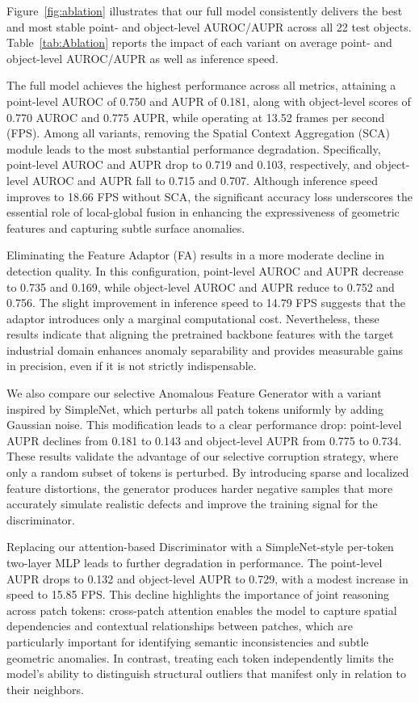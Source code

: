 Figure~\ref{fig:ablation} illustrates that our full model consistently delivers the best and most stable point- and object-level AUROC/AUPR across all 22 test objects. Table~\ref{tab:Ablation} reports the impact of each variant on average point- and object-level AUROC/AUPR as well as inference speed.

The full model achieves the highest performance across all metrics, attaining a point-level AUROC of 0.750 and AUPR of 0.181, along with object-level scores of 0.770 AUROC and 0.775 AUPR, while operating at 13.52 frames per second (FPS). Among all variants, removing the Spatial Context Aggregation (SCA) module leads to the most substantial performance degradation. Specifically, point-level AUROC and AUPR drop to 0.719 and 0.103, respectively, and object-level AUROC and AUPR fall to 0.715 and 0.707. Although inference speed improves to 18.66 FPS without SCA, the significant accuracy loss underscores the essential role of local-global fusion in enhancing the expressiveness of geometric features and capturing subtle surface anomalies.

Eliminating the Feature Adaptor (FA) results in a more moderate decline in detection quality. In this configuration, point-level AUROC and AUPR decrease to 0.735 and 0.169, while object-level AUROC and AUPR reduce to 0.752 and 0.756. The slight improvement in inference speed to 14.79 FPS suggests that the adaptor introduces only a marginal computational cost. Nevertheless, these results indicate that aligning the pretrained backbone features with the target industrial domain enhances anomaly separability and provides measurable gains in precision, even if it is not strictly indispensable.

We also compare our selective Anomalous Feature Generator with a variant inspired by SimpleNet, which perturbs all patch tokens uniformly by adding Gaussian noise. This modification leads to a clear performance drop: point-level AUPR declines from 0.181 to 0.143 and object-level AUPR from 0.775 to 0.734. These results validate the advantage of our selective corruption strategy, where only a random subset of tokens is perturbed. By introducing sparse and localized feature distortions, the generator produces harder negative samples that more accurately simulate realistic defects and improve the training signal for the discriminator.

Replacing our attention-based Discriminator with a SimpleNet-style per-token two-layer MLP leads to further degradation in performance. The point-level AUPR drops to 0.132 and object-level AUPR to 0.729, with a modest increase in speed to 15.85 FPS. This decline highlights the importance of joint reasoning across patch tokens: cross-patch attention enables the model to capture spatial dependencies and contextual relationships between patches, which are particularly important for identifying semantic inconsistencies and subtle geometric anomalies. In contrast, treating each token independently limits the model's ability to distinguish structural outliers that manifest only in relation to their neighbors.


